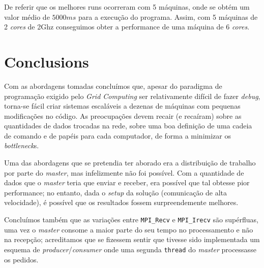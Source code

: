 \documentclass[a4paper]{article}
\begin{document}
De referir que os melhores runs ocorreram com 5 máquinas, onde se obtém um valor médio de $5000ms$ para a execução do programa. Assim, com 5 máquinas de 2 \textit{cores} de 2Ghz conseguimos obter a performance de uma máquina de 6 \textit{cores}.

\clearpage

\section{Conclusions}
\indent \indent Com as abordagens tomadas concluímos que, apesar do paradigma de programação exigido pelo \textit{Grid Computing} ser relativamente difícil de fazer \textit{debug}, torna-se fácil criar sistemas escaláveis a dezenas de máquinas com pequenas modificações no código. As preocupações devem recair (e recaíram) sobre as quantidades de dados trocadas na rede, sobre uma boa definição de uma cadeia de comando e de papéis para cada computador, de forma a minimizar os \textit{bottleneck}s.

Uma das abordagens que se pretendia ter aborado era a distribuição de trabalho por parte do \textit{master}, mas infelizmente não foi possível. Com a quantidade de dados que o \textit{master} teria que enviar e receber, era possível que tal obtesse pior performance; no entanto, dada o \textit{setup} da solução (comunicação de alta velocidade), é possível que os resultados fossem surpreendemente melhores.

Concluímos também que as variações entre \texttt{MPI\_Recv} e \texttt{MPI\_Irecv} são supérfluas, uma vez o \textit{master} consome a maior parte do seu tempo no processamento e não na recepção; acreditamos que se fizessem sentir que tivesse sido implementada um esquema de \textit{producer}/\textit{consumer} onde uma segunda \texttt{thread} do \textit{master} processasse os pedidos.
\clearpage
\end{document}
